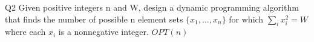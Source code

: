 \begin{problem}
  {Q2}
  Given positive integers n and W, design a dynamic programming algorithm that finds
  the number of possible n element sets $\{x_1, \dots , x_n\}$ for which $\sum_i x_i^2 = W$ where each
  $x_i$ is a nonnegative integer.
  \noindent
  $OPT(n)$
\end{problem}
